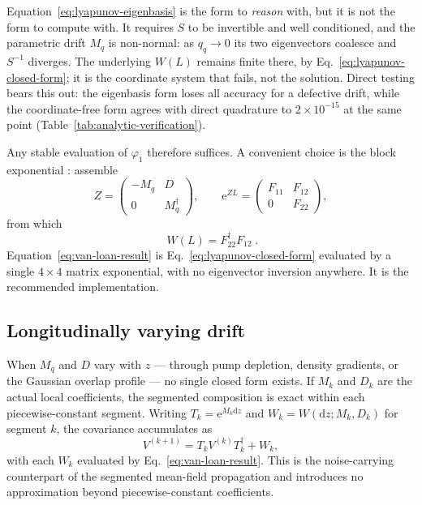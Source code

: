 \documentclass[11pt,a4paper]{article}
\newcommand{\dd}{\mathrm d}
\newcommand{\e}{\mathrm e}
\begin{document}
Equation~\eqref{eq:lyapunov-eigenbasis} is the form to \emph{reason} with,
but it is not the form to compute with. It requires $S$ to be invertible and
well conditioned, and the parametric drift $M_q$ is non-normal: as $q_q\to0$
its two eigenvectors coalesce and $S^{-1}$ diverges. The underlying $W(L)$
remains finite there, by Eq.~\eqref{eq:lyapunov-closed-form}; it is the
coordinate system that fails, not the solution. Direct testing bears this out:
the eigenbasis form loses all accuracy for a defective drift, while the
coordinate-free form agrees with direct quadrature to $2\times10^{-15}$ at the
same point (Table~\ref{tab:analytic-verification}).

Any stable evaluation of $\varphi_1$ therefore suffices. A convenient choice
is the block exponential \cite{VanLoan1978}: assemble
\begin{equation}
Z=\begin{pmatrix}-M_q&D\\0&M_q^\dagger\end{pmatrix},\qquad
\e^{ZL}=\begin{pmatrix}F_{11}&F_{12}\\0&F_{22}\end{pmatrix},
\label{eq:van-loan-block}
\end{equation}
from which
\begin{equation}
\boxed{\;W(L)=F_{22}^\dagger F_{12}\; .}
\label{eq:van-loan-result}
\end{equation}
Equation~\eqref{eq:van-loan-result} is Eq.~\eqref{eq:lyapunov-closed-form}
evaluated by a single $4\times4$ matrix exponential, with no eigenvector
inversion anywhere. It is the recommended implementation.

\subsection{Longitudinally varying drift}

When $M_q$ and $D$ vary with $z$ --- through pump depletion, density
gradients, or the Gaussian overlap profile --- no single closed form exists.
If $M_k$ and $D_k$ are the actual local coefficients, the segmented
composition is exact within each piecewise-constant segment. Writing
$T_k=\e^{M_k\dd z}$ and $W_k=W(\dd z;M_k,D_k)$ for segment $k$, the
covariance accumulates as
\begin{equation}
V^{(k+1)}=T_kV^{(k)}T_k^\dagger+W_k ,
\label{eq:segmented-covariance}
\end{equation}
with each $W_k$ evaluated by Eq.~\eqref{eq:van-loan-result}. This is the
noise-carrying counterpart of the segmented mean-field propagation and
introduces no approximation beyond piecewise-constant coefficients.
\end{document}
